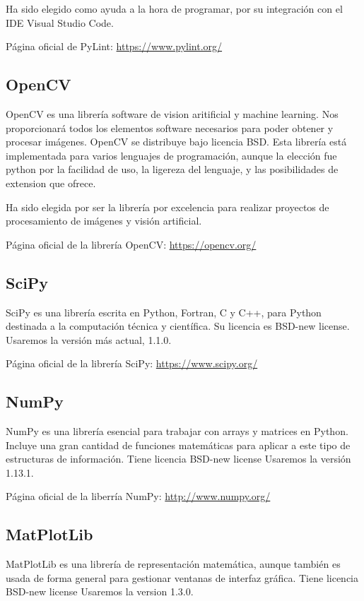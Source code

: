 Ha sido elegido como ayuda a la hora de programar, por su integración con el IDE Visual Studio Code.

Página oficial de PyLint: \url{https://www.pylint.org/}

\subsection{OpenCV}
OpenCV es una librería software de vision aritificial y machine learning. Nos proporcionará todos los elementos software necesarios para poder obtener y procesar imágenes. 
OpenCV se distribuye bajo licencia BSD. 
Esta librería está implementada para varios lenguajes de programación, aunque la elección fue python por la facilidad de uso, la ligereza del lenguaje, y las posibilidades de extension que ofrece.

Ha sido elegida por ser la librería por excelencia para realizar proyectos de procesamiento de imágenes y visión artificial.

Página oficial de la librería OpenCV: \url{https://opencv.org/}

\subsection{SciPy}
SciPy es una librería escrita en Python, Fortran, C y C++, para Python destinada a la computación técnica y científica. 
Su licencia es BSD-new license.
Usaremos la versión más actual, 1.1.0.

Página oficial de la librería SciPy: \url{https://www.scipy.org/}

\subsection{NumPy}
NumPy es una librería esencial para trabajar con arrays y matrices en Python. Incluye una gran cantidad de funciones matemáticas para aplicar a este tipo de estructuras de información.
Tiene licencia BSD-new license
Usaremos la versión 1.13.1.

Página oficial de la liberría NumPy: \url{http://www.numpy.org/}

\subsection{MatPlotLib}
MatPlotLib es una librería de representación matemática, aunque también es usada de forma general para gestionar ventanas de interfaz gráfica.
Tiene licencia BSD-new license
Usaremos la version 1.3.0.

